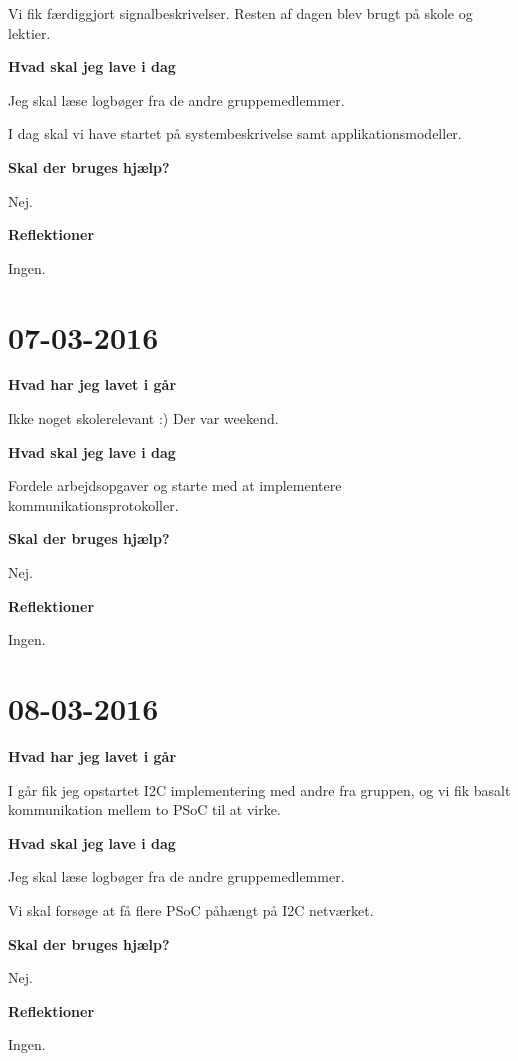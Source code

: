 \documentclass{article}
\begin{document}
	Vi fik færdiggjort signalbeskrivelser. Resten af dagen blev brugt på skole og lektier.
	
	\textbf{Hvad skal jeg lave i dag}
	
	Jeg skal læse logbøger fra de andre gruppemedlemmer.
	
	I dag skal vi have startet på systembeskrivelse samt applikationsmodeller.
	
	\textbf{Skal der bruges hjælp?}
	
	Nej.
	
	\textbf{Reflektioner}
	
	Ingen.
	
	\section{07-03-2016}
	
	\textbf{Hvad har jeg lavet i går}
	
	Ikke noget skolerelevant :) Der var weekend.
	
	\textbf{Hvad skal jeg lave i dag}
	
	Fordele arbejdsopgaver og starte med at implementere kommunikationsprotokoller.
	
	\textbf{Skal der bruges hjælp?}
	
	Nej.
	
	\textbf{Reflektioner}
	
	Ingen.
	
	\section{08-03-2016}
	
	\textbf{Hvad har jeg lavet i går}
	
	I går fik jeg opstartet I2C implementering med andre fra gruppen, og vi fik basalt kommunikation mellem to PSoC til at virke.
	
	\textbf{Hvad skal jeg lave i dag}
	
	Jeg skal læse logbøger fra de andre gruppemedlemmer.
	
	Vi skal forsøge at få flere PSoC påhængt på I2C netværket.
	
	\textbf{Skal der bruges hjælp?}
	
	Nej.
	
	\textbf{Reflektioner}
	
	Ingen.
\end{document}
